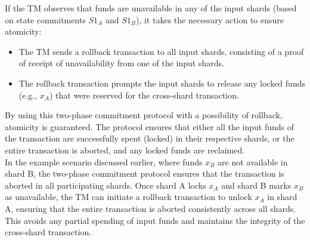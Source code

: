 If the TM observes that funds are unavailable in any of the input shards (based on state commitments $S1_{A}$ and $S1_{B}$), it takes the necessary action to ensure atomicity:\\
\begin{itemize}
	\item The TM sends a rollback transaction to all input shards, consisting of a proof of receipt of unavailability from one of the input shards.
	\item The rollback transaction prompts the input shards to release any locked funds (e.g., $x_{A}$) that were reserved for the cross-shard transaction.
\end{itemize}
By using this two-phase commitment protocol with a possibility of rollback, atomicity is guaranteed. The protocol ensures that either all the input funds of the transaction are successfully spent (locked) in their respective shards, or the entire transaction is aborted, and any locked funds are reclaimed.\\
In the example scenario discussed earlier, where funds $x_{B}$ are not available in shard B, the two-phase commitment protocol ensures that the transaction is aborted in all participating shards. Once shard A locks $x_{A}$ and shard B marks $x_{B}$ as unavailable, the TM can initiate a rollback transaction to unlock $x_{A}$ in shard A, ensuring that the entire transaction is aborted consistently across all shards. This avoids any partial spending of input funds and maintains the integrity of the cross-shard transaction.